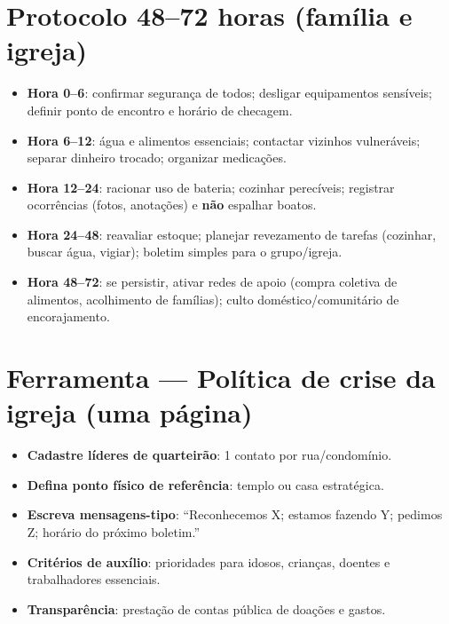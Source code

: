 \section{Protocolo 48--72 horas (família e igreja)}
\begin{checklist}[title={Passo a passo objetivo},breakable]
\begin{itemize}[leftmargin=*,noitemsep]
  \item \textbf{Hora 0--6}: confirmar segurança de todos; desligar equipamentos sensíveis; definir ponto de encontro e horário de checagem.
  \item \textbf{Hora 6--12}: água e alimentos essenciais; contactar vizinhos vulneráveis; separar dinheiro trocado; organizar medicações.
  \item \textbf{Hora 12--24}: racionar uso de bateria; cozinhar perecíveis; registrar ocorrências (fotos, anotações) e \textbf{não} espalhar boatos.
  \item \textbf{Hora 24--48}: reavaliar estoque; planejar revezamento de tarefas (cozinhar, buscar água, vigiar); boletim simples para o grupo/igreja.
  \item \textbf{Hora 48--72}: se persistir, ativar redes de apoio (compra coletiva de alimentos, acolhimento de famílias); culto doméstico/comunitário de encorajamento.
\end{itemize}
\end{checklist}

\section{Ferramenta --- Política de crise da igreja (uma página)}
\begin{checklist}
\begin{itemize}[leftmargin=*,noitemsep]
  \item \textbf{Cadastre líderes de quarteirão}: 1 contato por rua/condomínio.
  \item \textbf{Defina ponto físico de referência}: templo ou casa estratégica.
  \item \textbf{Escreva mensagens-tipo}: ``Reconhecemos X; estamos fazendo Y; pedimos Z; horário do próximo boletim.''
  \item \textbf{Critérios de auxílio}: prioridades para idosos, crianças, doentes e trabalhadores essenciais.
  \item \textbf{Transparência}: prestação de contas pública de doações e gastos.
\end{itemize}
\end{checklist}

